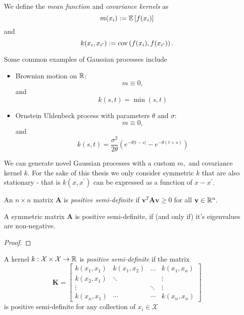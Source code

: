 \begin{definition}\label{def:mean_kernel}
    We define the \emph{mean function} and \emph{covariance kernels} as
    $$m(x_i) := \operatorname{\mathbb{E}}\left[f(x_i)\right]$$ and
    $$k(x_{i}, x_{i^\prime}) := \operatorname{cov}\left(f(x_i), f(x_{i^\prime})\right).$$
\end{definition}

Some common examples of Gaussian processes include \begin{itemize}
    \item Brownian motion on $\mathbb{R}$: $$m\equiv 0,$$ and $$k(s, t) = \min(s, t)$$
    \item Ornstein Uhlenbeck process with parameters $\theta$ and $\sigma$:
          $$m\equiv 0,$$ and
          $$k(s, t)
              = \frac{\sigma^2}{2\theta}
              \left(e^{-\theta|t - s|} - e^{-\theta(t + s)}\right)$$
\end{itemize}

We can generate novel Gaussian processes with a custom $m,$ and
covariance kernel $k.$ For the sake of this thesis we only consider symmetric
$k$ that are also stationary - that is $k(x, x^\prime)$ can be expressed as a
function of $x - x^\prime.$

\begin{definition}\label{def:pos_def_mat}
    An $n\times n$ matrix $\mathbf{A}$ is \emph{positive semi-definite} if
    $\mathbf{v}^T\mathbf{A}\mathbf{v} \geq 0$ for all $\mathbf{v}\in\mathbb{R}^n.$
\end{definition}

\begin{theorem}
    A symmetric matrix $\mathbf{A}$ is positive semi-definite, if (and only if)
    it's eigenvalues are non-negative.
\end{theorem}
\begin{proof}
\end{proof}

\begin{definition}\label{def:pos_def_ker}
    A kernel $k:\mathcal{X}\times\mathcal{X}\to\mathbb{R}$ is
    \emph{positive semi-definite} if the matrix
    $$\mathbf{K} = \begin{bmatrix}
            k(x_1, x_1) & k(x_1, x_2) & \dots  & k(x_1, x_n) \\
            k(x_2, x_1) & \ddots      &        & \vdots      \\
            \vdots      &             & \ddots & \vdots      \\
            k(x_n, x_1) & \cdots      & \cdots & k(x_n, x_n)
        \end{bmatrix}$$
    is positive semi-definite for any collection of $x_i\in\mathcal{X}$
\end{definition}


